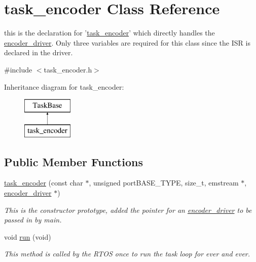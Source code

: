 \hypertarget{classtask__encoder}{\section{task\-\_\-encoder Class Reference}
\label{classtask__encoder}
}


this is the declaration for '\hyperlink{classtask__encoder}{task\-\_\-encoder}' which directly handles the \hyperlink{classencoder__driver}{encoder\-\_\-driver}. Only three variables are required for this class since the I\-S\-R is declared in the driver.  




{\ttfamily \#include $<$task\-\_\-encoder.\-h$>$}

Inheritance diagram for task\-\_\-encoder\-:\begin{figure}[H]
\begin{center}
\leavevmode
\includegraphics[height=2.000000cm]{classtask__encoder}
\end{center}
\end{figure}
\subsection*{Public Member Functions}
\begin{DoxyCompactItemize}
\item 
\hyperlink{classtask__encoder_ae099e34c1fdea7272e4adc5b85372869}{task\-\_\-encoder} (const char $\ast$, unsigned port\-B\-A\-S\-E\-\_\-\-T\-Y\-P\-E, size\-\_\-t, emstream $\ast$, \hyperlink{classencoder__driver}{encoder\-\_\-driver} $\ast$)
\begin{DoxyCompactList}\small\item\em This is the constructor prototype, added the pointer for an \hyperlink{classencoder__driver}{encoder\-\_\-driver} to be passed in by main. \end{DoxyCompactList}\item 
void \hyperlink{classtask__encoder_a8380b1f111bf5d6b4256f16e355c0afc}{run} (void)
\begin{DoxyCompactList}\small\item\em This method is called by the R\-T\-O\-S once to run the task loop for ever and ever. \end{DoxyCompactList}\end{DoxyCompactItemize}
